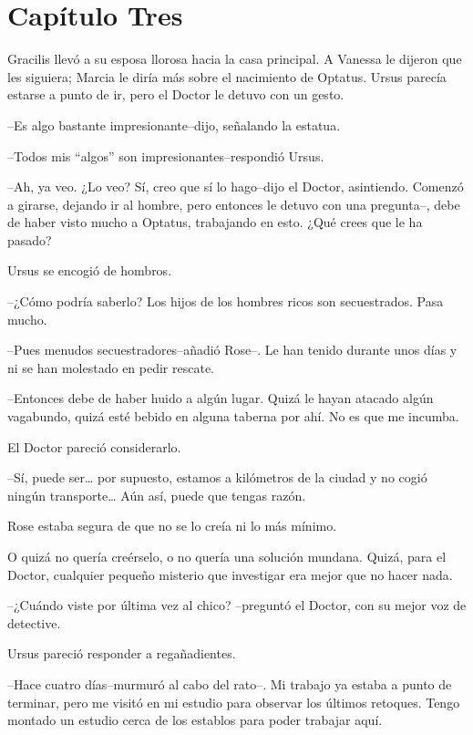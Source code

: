 \chapter*{Capítulo Tres}

Gracilis llevó a su esposa llorosa hacia la casa principal. A Vanessa le
dijeron que les siguiera; Marcia le diría más sobre el nacimiento de
Optatus. Ursus parecía estarse a punto de ir, pero el Doctor le detuvo
con un gesto.

--Es algo bastante impresionante--dijo, señalando la estatua.

--Todos mis ``algos'' son impresionantes--respondió Ursus.

--Ah, ya veo. ¿Lo veo? Sí, creo que sí lo hago--dijo el Doctor,
asintiendo. Comenzó a girarse, dejando ir al hombre, pero entonces le
detuvo con una pregunta--, debe de haber visto mucho a Optatus,
trabajando en esto. ¿Qué crees que le ha pasado?

Ursus se encogió de hombros.

--¿Cómo podría saberlo? Los hijos de los hombres ricos son secuestrados.
Pasa mucho.

--Pues menudos secuestradores--añadió Rose--. Le han tenido durante unos
días y ni se han molestado en pedir rescate.

--Entonces debe de haber huido a algún lugar. Quizá le hayan atacado
algún vagabundo, quizá esté bebido en alguna taberna por ahí. No es que
me incumba.

El Doctor pareció considerarlo.

--Sí, puede ser\ldots{} por supuesto, estamos a kilómetros de la ciudad
y no cogió ningún transporte\ldots{} Aún así, puede que tengas razón.

Rose estaba segura de que no se lo creía ni lo más mínimo.

O quizá no quería creérselo, o no quería una solución mundana. Quizá,
para el Doctor, cualquier pequeño misterio que investigar era mejor que
no hacer nada.

--¿Cuándo viste por última vez al chico? --preguntó el Doctor, con su
mejor voz de detective.

Ursus pareció responder a regañadientes.

--Hace cuatro días--murmuró al cabo del rato--. Mi trabajo ya estaba a
punto de terminar, pero me visitó en mi estudio para observar los
últimos retoques. Tengo montado un estudio cerca de los establos para
poder trabajar aquí.

